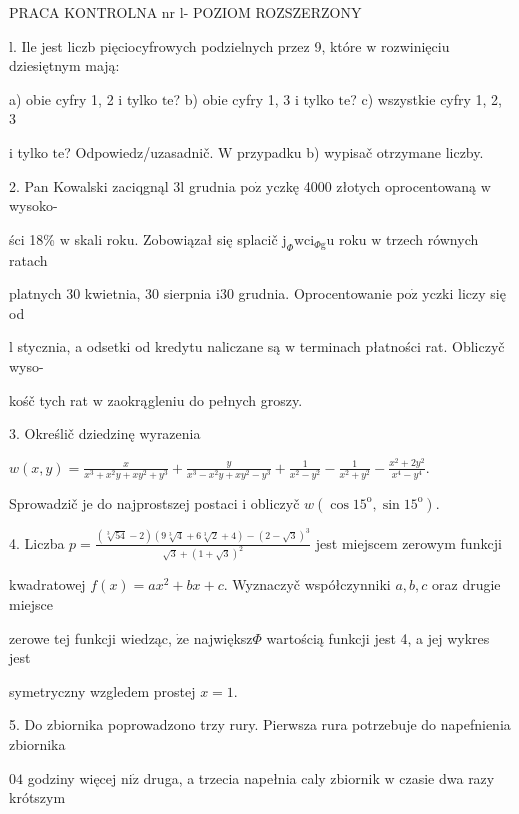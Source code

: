 \documentclass[a4paper,12pt]{article}
\begin{document}
PRACA KONTROLNA nr l- POZIOM ROZSZERZONY

l. Ile jest liczb pięciocyfrowych podzielnych przez 9, które $\mathrm{w}$ rozwinięciu dziesiętnym mają:

a) obie cyfry 1, 2 $\mathrm{i}$ tylko $\mathrm{t}\mathrm{e}$? b) obie cyfry 1, 3 $\mathrm{i}$ tylko $\mathrm{t}\mathrm{e}$? c) wszystkie cyfry 1, 2, 3

$\mathrm{i}$ tylko $\mathrm{t}\mathrm{e}$? Odpowiedz/uzasadnič. $\mathrm{W}$ przypadku b) wypisač otrzymane liczby.

2. Pan Kowalski zaciqgnąl 3l grudnia $\mathrm{p}\mathrm{o}\dot{\mathrm{z}}$ yczkę 4000 złotych oprocentowaną $\mathrm{w}$ wysoko-

ści 18\% $\mathrm{w}$ skali roku. Zobowiązał się splacič $\mathrm{j}_{\Phi}\mathrm{w}\mathrm{c}\mathrm{i}_{\Phi \mathrm{g}}\mathrm{u}$ roku $\mathrm{w}$ trzech równych ratach

platnych 30 kwietnia, 30 sierpnia $\mathrm{i}30$ grudnia. Oprocentowanie $\mathrm{p}\mathrm{o}\dot{\mathrm{z}}$ yczki liczy się od

l stycznia, a odsetki od kredytu naliczane są $\mathrm{w}$ terminach płatności rat. Obliczyč wyso-

kośč tych rat $\mathrm{w}$ zaokrągleniu do pełnych groszy.

3. Określič dziedzinę wyrazenia

$w(x,y)=\displaystyle \frac{x}{x^{3}+x^{2}y+xy^{2}+y^{3}}+\frac{y}{x^{3}-x^{2}y+xy^{2}-y^{3}}+\frac{1}{x^{2}-y^{2}}-\frac{1}{x^{2}+y^{2}}-\frac{x^{2}+2y^{2}}{x^{4}-y^{4}}.$

Sprowadzič je do najprostszej postaci $\mathrm{i}$ obliczyč $w(\cos 15^{\mathrm{o}},\sin 15^{\mathrm{o}}).$

4. Liczba $p = \displaystyle \frac{(\sqrt[3]{54}-2)(9\sqrt[3]{4}+6\sqrt[3]{2}+4)-(2-\sqrt{3})^{3}}{\sqrt{3}+(1+\sqrt{3})^{2}}$ jest miejscem zerowym funkcji

kwadratowej $f(x)=ax^{2}+bx+c$. Wyznaczyč współczynniki $a, b, c$ oraz drugie miejsce

zerowe tej funkcji wiedząc, $\dot{\mathrm{z}}\mathrm{e}$ największ$\Phi$ wartością funkcji jest 4, a jej wykres jest

symetryczny wzgledem prostej $x=1.$

5. Do zbiornika poprowadzono trzy rury. Pierwsza rura potrzebuje do napefnienia zbiornika

$04$ godziny więcej $\mathrm{n}\mathrm{i}\dot{\mathrm{z}}$ druga, a trzecia napełnia caly zbiornik $\mathrm{w}$ czasie dwa razy krótszym
\end{document}
